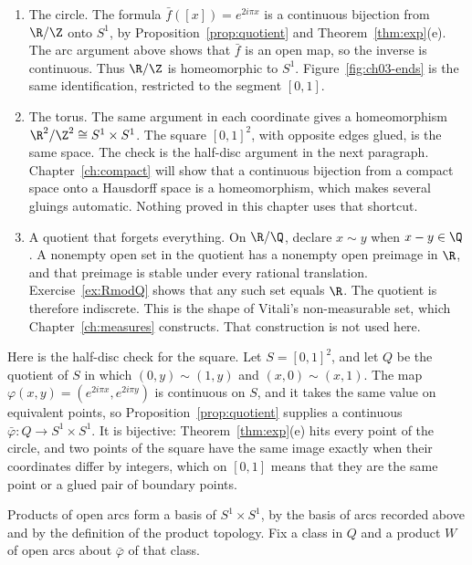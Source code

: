 \begin{example}\label{ex:quotients}
\begin{enumerate}[label=(\alph*)]
\item The circle. The formula $\bar f([x])=e^{2i\pi x}$ is a continuous bijection from $\R/\Z$ onto $S^1$, by Proposition~\ref{prop:quotient} and Theorem~\ref{thm:exp}(e). The arc argument above shows that $\bar f$ is an open map, so the inverse is continuous. Thus $\R/\Z$ is homeomorphic to $S^1$. Figure~\ref{fig:ch03-ends} is the same identification, restricted to the segment $[0,1]$.
\item The torus. The same argument in each coordinate gives a homeomorphism $\R^2/\Z^2\cong S^1\times S^1$. The square $[0,1]^2$, with opposite edges glued, is the same space. The check is the half-disc argument in the next paragraph. Chapter~\ref{ch:compact} will show that a continuous bijection from a compact space onto a Hausdorff space is a homeomorphism, which makes several gluings automatic. Nothing proved in this chapter uses that shortcut.
\item A quotient that forgets everything. On $\R/\Q$, declare $x\sim y$ when $x-y\in\Q$. A nonempty open set in the quotient has a nonempty open preimage in $\R$, and that preimage is stable under every rational translation. Exercise~\ref{ex:RmodQ} shows that any such set equals $\R$. The quotient is therefore indiscrete. This is the shape of Vitali's non-measurable set, which Chapter~\ref{ch:measures} constructs. That construction is not used here.
\end{enumerate}
\end{example}

Here is the half-disc check for the square. Let $S=[0,1]^2$, and let $Q$ be the quotient of $S$ in which $(0,y)\sim(1,y)$ and $(x,0)\sim(x,1)$. The map $\varphi(x,y)=(e^{2i\pi x},e^{2i\pi y})$ is continuous on $S$, and it takes the same value on equivalent points, so Proposition~\ref{prop:quotient} supplies a continuous $\bar\varphi:Q\to S^1\times S^1$. It is bijective: Theorem~\ref{thm:exp}(e) hits every point of the circle, and two points of the square have the same image exactly when their coordinates differ by integers, which on $[0,1]$ means that they are the same point or a glued pair of boundary points.

Products of open arcs form a basis of $S^1\times S^1$, by the basis of arcs recorded above and by the definition of the product topology. Fix a class in $Q$ and a product $W$ of open arcs about $\bar\varphi$ of that class.

